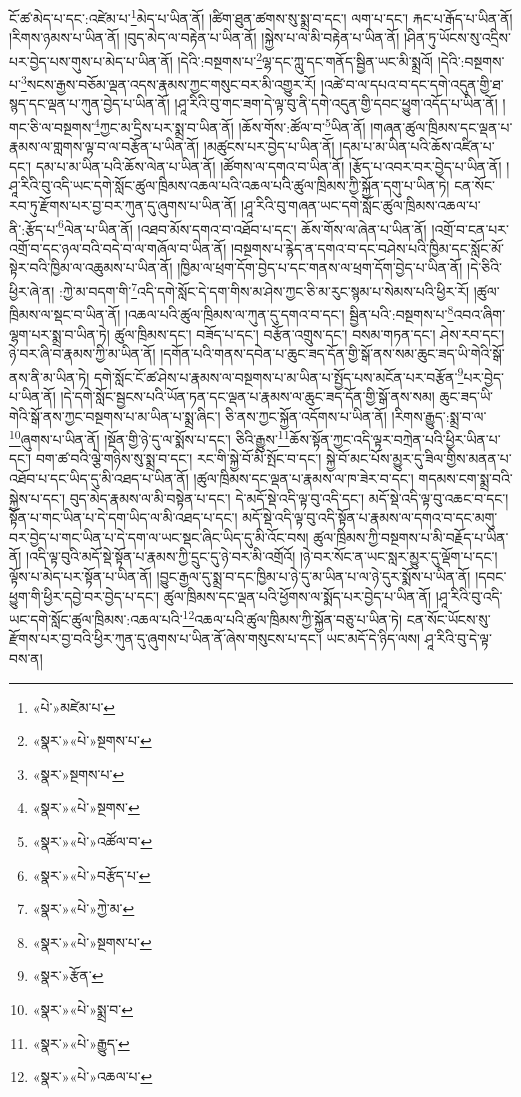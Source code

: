 ངོ་ཚ་མེད་པ་དང་:འཛེམ་པ་\footnote{«པེ་»མཛེམ་པ་}མེད་པ་ཡིན་ནོ། །ཚིག་ཐུན་ཚགས་སུ་སྨྲ་བ་དང་། ལག་པ་དང་། རྐང་པ་རྒོད་པ་ཡིན་ནོ། །རིགས་ཉམས་པ་ཡིན་ནོ། །བུད་མེད་ལ་བརྟེན་པ་ཡིན་ནོ། །སྐྱེས་པ་ལ་མི་བརྟེན་པ་ཡིན་ནོ། །ཤིན་ཏུ་ཡོངས་སུ་འདྲིས་པར་བྱེད་པས་གུས་པ་མེད་པ་ཡིན་ནོ། །དེའི་:བསྔགས་པ་\footnote{«སྣར་»«པེ་»སྔགས་པ་}ལྷ་དང་ཀླུ་དང་གནོད་སྦྱིན་ཡང་མི་སྨྲའོ། །དེའི་:བསྔགས་པ་\footnote{«སྣར་»སྔགས་པ་}སངས་རྒྱས་བཅོམ་ལྡན་འདས་རྣམས་ཀྱང་གསུང་བར་མི་འགྱུར་རོ། །འཚེ་བ་ལ་དཔའ་བ་དང་དགེ་འདུན་གྱི་ཐ་སྙད་དང་ལྡན་པ་ཀུན་བྱེད་པ་ཡིན་ནོ། །ཤཱ་རིའི་བུ་གང་ཟག་དེ་ལྟ་བུ་ནི་དགེ་འདུན་གྱི་དབང་ཕྱུག་འདོད་པ་ཡིན་ནོ། །གང་ཅི་ལ་བསྔགས་\footnote{«སྣར་»«པེ་»སྔགས་}ཀྱང་མ་དྲིས་པར་སྨྲ་བ་ཡིན་ནོ། །ཆོས་གོས་:ཚོལ་བ་\footnote{«སྣར་»«པེ་»འཚོལ་བ་}ཡིན་ནོ། །གཞན་ཚུལ་ཁྲིམས་དང་ལྡན་པ་རྣམས་ལ་གླགས་ལྟ་བ་ལ་བརྩོན་པ་ཡིན་ནོ། །མཚུངས་པར་བྱེད་པ་ཡིན་ནོ། །དམ་པ་མ་ཡིན་པའི་ཆོས་འཛིན་པ་དང་། དམ་པ་མ་ཡིན་པའི་ཆོས་ལེན་པ་ཡིན་ནོ། །ཚོགས་ལ་དགའ་བ་ཡིན་ནོ། །རྩོད་པ་འབར་བར་བྱེད་པ་ཡིན་ནོ། །ཤཱ་རིའི་བུ་འདི་ཡང་དགེ་སློང་ཚུལ་ཁྲིམས་འཆལ་པའི་འཆལ་པའི་ཚུལ་ཁྲིམས་ཀྱི་སྐྱོན་དགུ་པ་ཡིན་ཏེ། ངན་སོང་རབ་ཏུ་རྫོགས་པར་བྱ་བར་ཀུན་དུ་ཞུགས་པ་ཡིན་ནོ། །ཤཱ་རིའི་བུ་གཞན་ཡང་དགེ་སློང་ཚུལ་ཁྲིམས་འཆལ་པ་ནི་:རྩོད་པ་\footnote{«སྣར་»«པེ་»བརྩོད་པ་}ལེན་པ་ཡིན་ནོ། །འཐབ་མོས་དགའ་བ་འཐོབ་པ་དང་། ཆོས་གོས་ལ་ཞེན་པ་ཡིན་ནོ། །འགྲོ་བ་ངན་པར་འགྲོ་བ་དང་ཉལ་བའི་བདེ་བ་ལ་གཞོལ་བ་ཡིན་ནོ། །བསྔགས་པ་རྙེད་ན་དགའ་བ་དང་བཤེས་པའི་ཁྱིམ་དང་སློང་མོ་སྟེར་བའི་ཁྱིམ་ལ་འཆུམས་པ་ཡིན་ནོ། །ཁྱིམ་ལ་ཕྲག་དོག་བྱེད་པ་དང་གནས་ལ་ཕྲག་དོག་བྱེད་པ་ཡིན་ནོ། །དེ་ཅིའི་ཕྱིར་ཞེ་ན། :ཀྱེ་མ་བདག་གི་\footnote{«སྣར་»«པེ་»ཀྱེ་མ་}འདི་དགེ་སློང་དེ་དག་གིས་མ་ཤེས་ཀྱང་ཅི་མ་རུང་སྙམ་པ་སེམས་པའི་ཕྱིར་རོ། །ཚུལ་ཁྲིམས་ལ་སྡང་བ་ཡིན་ནོ། །འཆལ་པའི་ཚུལ་ཁྲིམས་ལ་ཀུན་དུ་དགའ་བ་དང་། སྦྱིན་པའི་:བསྔགས་པ་\footnote{«སྣར་»«པེ་»སྔགས་པ་}འབའ་ཞིག་ལྷག་པར་སྨྲ་བ་ཡིན་ཏེ། ཚུལ་ཁྲིམས་དང་། བཟོད་པ་དང་། བརྩོན་འགྲུས་དང་། བསམ་གཏན་དང་། ཤེས་རབ་དང་། ཉེ་བར་ཞི་བ་རྣམས་ཀྱི་མ་ཡིན་ནོ། །དགོན་པའི་གནས་དབེན་པ་ཆུང་ཟད་དོན་གྱི་སྒོ་ནས་སམ་ཆུང་ཟད་ཡི་གེའི་སྒོ་ནས་ནི་མ་ཡིན་ཏེ། དགེ་སློང་ངོ་ཚ་ཤེས་པ་རྣམས་ལ་བསྔགས་པ་མ་ཡིན་པ་སྤྱོད་པས་མངོན་པར་བརྩོན་\footnote{«སྣར་»རྩོན་}པར་བྱེད་པ་ཡིན་ནོ། །དེ་དགེ་སློང་སྦྱངས་པའི་ཡོན་ཏན་དང་ལྡན་པ་རྣམས་ལ་ཆུང་ཟད་དོན་གྱི་སྒོ་ནས་སམ། ཆུང་ཟད་ཡི་གེའི་སྒོ་ནས་ཀྱང་བསྔགས་པ་མ་ཡིན་པ་སྨྲ་ཞིང་། ཅི་ནས་ཀྱང་སྐྱོན་འདོགས་པ་ཡིན་ནོ། །རིགས་རྒྱུད་:སྨྲ་བ་ལ་\footnote{«སྣར་»«པེ་»སྨྲ་བ་}ཞུགས་པ་ཡིན་ནོ། །སྔོན་གྱི་ཉེ་དུ་ལ་སྨོས་པ་དང་། ཅིའི་རྒྱུས་\footnote{«སྣར་»«པེ་»རྒྱུད་}ཆོས་སྟོན་ཀྱང་འདི་ལྟར་བཀྲེན་པའི་ཕྱིར་ཡིན་པ་དང་། བག་ཚ་བའི་ལྕེ་གཉིས་སུ་སྨྲ་བ་དང་། རང་གི་སྐྱེ་བོ་མི་སྤོང་བ་དང་། སྐྱེ་བོ་མང་པོས་མྱུར་དུ་ཟིལ་གྱིས་མནན་པ་འཐོབ་པ་དང་ཡིད་དུ་མི་འཐད་པ་ཡིན་ནོ། །ཚུལ་ཁྲིམས་དང་ལྡན་པ་རྣམས་ལ་ཁ་ཟེར་བ་དང་། གདམས་ངག་སྨྲ་བའི་སྐྱེས་པ་དང་། བུད་མེད་རྣམས་ལ་མི་བསྟེན་པ་དང་། དེ་མདོ་སྡེ་འདི་ལྟ་བུ་འདི་དང་། མདོ་སྡེ་འདི་ལྟ་བུ་འཆང་བ་དང་། སྟོན་པ་གང་ཡིན་པ་དེ་དག་ཡིད་ལ་མི་འཐད་པ་དང་། མདོ་སྡེ་འདི་ལྟ་བུ་འདི་སྟོན་པ་རྣམས་ལ་དགའ་བ་དང་མགུ་བར་བྱེད་པ་གང་ཡིན་པ་དེ་དག་ལ་ཡང་སྡང་ཞིང་ཡིད་དུ་མི་འོང་བས། ཚུལ་ཁྲིམས་ཀྱི་བསྔགས་པ་མི་བརྗོད་པ་ཡིན་ནོ། །འདི་ལྟ་བུའི་མདོ་སྡེ་སྟོན་པ་རྣམས་ཀྱི་དྲུང་དུ་ཉེ་བར་མི་འགྲོའོ། །ཉེ་བར་སོང་ན་ཡང་སླར་མྱུར་དུ་ལྡོག་པ་དང་། ལྟོས་པ་མེད་པར་སྟོན་པ་ཡིན་ནོ། །བྱུང་རྒྱལ་དུ་སྨྲ་བ་དང་ཁྱིམ་པ་ཉེ་དུ་མ་ཡིན་པ་ལ་ཉེ་དུར་སྨོས་པ་ཡིན་ནོ། །དབང་ཕྱུག་གི་ཕྱིར་དབྱེ་བར་བྱེད་པ་དང་། ཚུལ་ཁྲིམས་དང་ལྡན་པའི་ཕྱོགས་ལ་སྨོད་པར་བྱེད་པ་ཡིན་ནོ། །ཤཱ་རིའི་བུ་འདི་ཡང་དགེ་སློང་ཚུལ་ཁྲིམས་:འཆལ་པའི་\footnote{«སྣར་»«པེ་»འཆལ་པ་}འཆལ་པའི་ཚུལ་ཁྲིམས་ཀྱི་སྐྱོན་བཅུ་པ་ཡིན་ཏེ། ངན་སོང་ཡོངས་སུ་རྫོགས་པར་བྱ་བའི་ཕྱིར་ཀུན་དུ་ཞུགས་པ་ཡིན་ནོ་ཞེས་གསུངས་པ་དང་། ཡང་མདོ་དེ་ཉིད་ལས། ཤཱ་རིའི་བུ་དེ་ལྟ་བས་ན། 